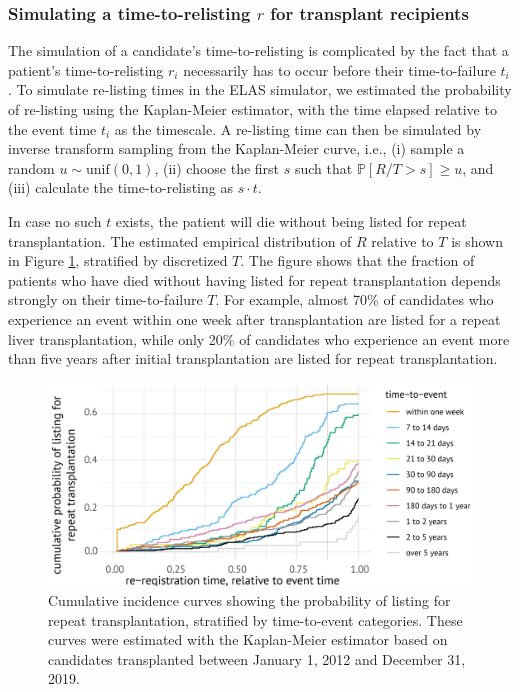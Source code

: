 \documentclass[11pt,twoside,]{book}
\begin{document}
\subsubsection{\texorpdfstring{Simulating a time-to-relisting \(r\) for transplant recipients}{Simulating a time-to-relisting r for transplant recipients}}\label{sec:elassrelisting}

The simulation of a candidate's time-to-relisting is complicated by the fact that
a patient's time-to-relisting \(r_i\) necessarily has to occur before their
time-to-failure \(t_i\). To simulate re-listing times in the ELAS simulator, we
estimated the probability of re-listing using the Kaplan-Meier estimator, with the
time elapsed relative to the event time \(t_i\) as the timescale. A
re-listing time can then be simulated by inverse transform sampling from the
Kaplan-Meier curve, i.e., (i)
sample a random \(u \sim \text{unif}(0,1)\), (ii) choose the first \(s\) such that \(\mathbb{P}[R/T > s] \geq u\), and (iii)
calculate the time-to-relisting as \(s \cdot t\).

In case no such \(t\) exists, the patient will die without being listed for repeat
transplantation. The estimated empirical distribution of \(R\) relative to \(T\) is
shown in Figure \ref{fig:ch5sfig6}, stratified by discretized \(T\). The figure
shows that the fraction of patients who have died without having listed for
repeat transplantation depends strongly on their time-to-failure \(T\). For example, almost 70\% of
candidates who experience an event within one week after transplantation are
listed for a repeat liver transplantation, while only 20\% of candidates
who experience an event more than five years after initial transplantation are
listed for repeat transplantation.

\begin{figure}[ht]

{\centering \includegraphics[width=1\linewidth]{figures/ch5//sfig6} 

}

\caption{Cumulative incidence curves showing the probability of listing for repeat transplantation, stratified by time-to-event categories. These curves were estimated with the Kaplan-Meier estimator based on candidates transplanted between January 1, 2012 and December 31, 2019.}\label{fig:ch5sfig6}
\end{figure}
\end{document}
